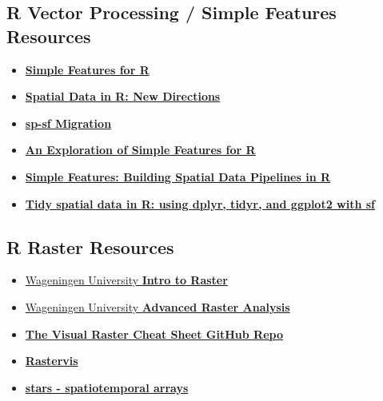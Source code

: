 \documentclass[
]{book}
\providecommand{\tightlist}{%
  \setlength{\itemsep}{0pt}\setlength{\parskip}{0pt}}
\begin{document}
\hypertarget{r-vector-processing-simple-features-resources}{%
\subsection{R Vector Processing / Simple Features Resources}\label{r-vector-processing-simple-features-resources}}

\begin{itemize}
\tightlist
\item
  \href{https://r-spatial.github.io/sf/index.html}{\textbf{Simple Features for R}}
\item
  \href{https://edzer.github.io/UseR2017/}{\textbf{Spatial Data in R: New Directions}}
\item
  \href{https://github.com/r-spatial/sf/wiki/Migrating}{\textbf{sp-sf Migration}}
\item
  \href{https://www.jessesadler.com/post/simple-feature-objects/}{\textbf{An Exploration of Simple Features for R}}
\item
  \href{https://www.azavea.com/blog/2017/08/30/spatial-analysis-pipelines-in-r-with-simple-features/}{\textbf{Simple Features: Building Spatial Data Pipelines in R}}
\item
  \href{http://strimas.com/r/tidy-sf/}{\textbf{Tidy spatial data in R: using dplyr, tidyr, and ggplot2 with sf}}
\end{itemize}

\hypertarget{r-raster-resources}{%
\subsection{R Raster Resources}\label{r-raster-resources}}

\begin{itemize}
\tightlist
\item
  \href{http://geoscripting-wur.github.io/IntroToRaster/}{Wageningen University \textbf{Intro to Raster}}
\item
  \href{https://geoscripting-wur.github.io/AdvancedRasterAnalysis/}{Wageningen University \textbf{Advanced Raster Analysis}}
\item
  \href{https://github.com/etiennebr/visualraster}{\textbf{The Visual Raster Cheat Sheet GitHub Repo}}
\item
  \href{https://oscarperpinan.github.io/rastervis/}{\textbf{Rastervis}}
\item
  \href{https://r-spatial.github.io/stars/}{\textbf{stars - spatiotemporal arrays}}
\end{itemize}
\end{document}
